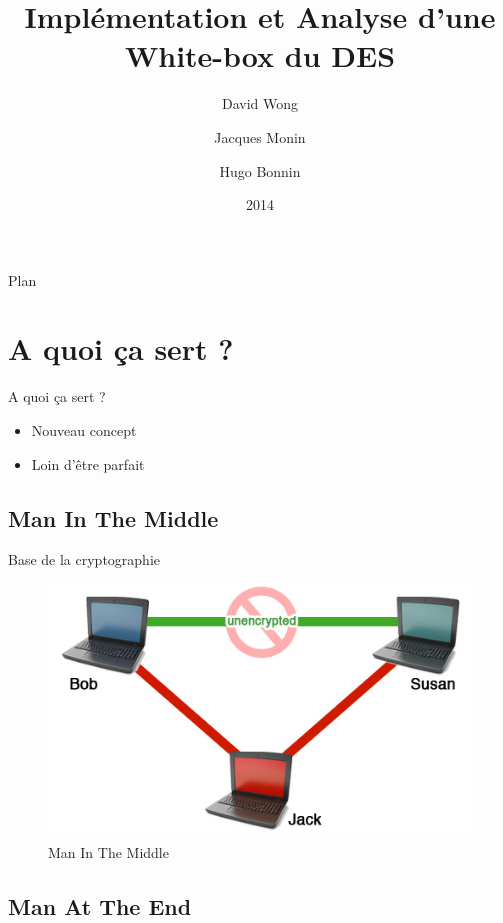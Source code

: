 \documentclass{beamer}
\author{David Wong
  \and Jacques Monin
  \and Hugo Bonnin}
\title{Implémentation et Analyse d'une White-box du DES}
\institute{Université de Bordeaux}
\date{2014}
\begin{document}
\begin{frame}
  \titlepage
\end{frame}


\begin{frame}{Plan}
  \tableofcontents
\end{frame}

\section{A quoi ça sert ?}

\begin{frame}{A quoi ça sert ?}
  \begin{itemize}
  \item Nouveau concept
  \item Loin d'être parfait
  \end{itemize}
\end{frame}

\subsection{Man In The Middle}

\begin{frame}{Base de la cryptographie}

  \begin{figure}[h]
    \centering
    \includegraphics[scale=0.50]{./images/mimt.jpg}
    \caption{Man In The Middle}
    \label{fig:keygen}
  \end{figure}

\end{frame}

\subsection{Man At The End}
\end{document}
